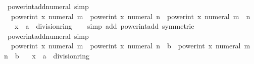 \begin{isabellebody}
\isanewline
\isanewline
\isanewline
{}\isamarkupfalse%
\ power{\isacharunderscore}{\kern0pt}int{\isacharunderscore}{\kern0pt}add{\isacharunderscore}{\kern0pt}numeral\ {\isacharbrackleft}{\kern0pt}simp{\isacharbrackright}{\kern0pt}{\isacharcolon}{\kern0pt}\isanewline
\ \ {\isachardoublequoteopen}power{\isacharunderscore}{\kern0pt}int\ x\ {\isacharparenleft}{\kern0pt}numeral\ m{\isacharparenright}{\kern0pt}\ {\isacharasterisk}{\kern0pt}\ power{\isacharunderscore}{\kern0pt}int\ x\ {\isacharparenleft}{\kern0pt}numeral\ n{\isacharparenright}{\kern0pt}\ {\isacharequal}{\kern0pt}\ power{\isacharunderscore}{\kern0pt}int\ x\ {\isacharparenleft}{\kern0pt}numeral\ {\isacharparenleft}{\kern0pt}m\ {\isacharplus}{\kern0pt}\ n{\isacharparenright}{\kern0pt}{\isacharparenright}{\kern0pt}{\isachardoublequoteclose}\isanewline
\ \ \ x\ {\isacharcolon}{\kern0pt}{\isacharcolon}{\kern0pt}\ {\isachardoublequoteopen}{\isacharprime}{\kern0pt}a\ {\isacharcolon}{\kern0pt}{\isacharcolon}{\kern0pt}\ division{\isacharunderscore}{\kern0pt}ring{\isachardoublequoteclose}\isanewline
%
\isadelimproof
\ \ %
\endisadelimproof
%
\isatagproof
{}\isamarkupfalse%
\ {\isacharparenleft}{\kern0pt}simp\ add{\isacharcolon}{\kern0pt}\ power{\isacharunderscore}{\kern0pt}int{\isacharunderscore}{\kern0pt}add\ {\isacharbrackleft}{\kern0pt}symmetric{\isacharbrackright}{\kern0pt}{\isacharparenright}{\kern0pt}%
\endisatagproof
{\isafoldproof}%
%
\isadelimproof
\isanewline
%
\endisadelimproof
\isanewline
{}\isamarkupfalse%
\ power{\isacharunderscore}{\kern0pt}int{\isacharunderscore}{\kern0pt}add{\isacharunderscore}{\kern0pt}numeral{}\ {\isacharbrackleft}{\kern0pt}simp{\isacharbrackright}{\kern0pt}{\isacharcolon}{\kern0pt}\isanewline
\ \ {\isachardoublequoteopen}power{\isacharunderscore}{\kern0pt}int\ x\ {\isacharparenleft}{\kern0pt}numeral\ m{\isacharparenright}{\kern0pt}\ {\isacharasterisk}{\kern0pt}\ {\isacharparenleft}{\kern0pt}power{\isacharunderscore}{\kern0pt}int\ x\ {\isacharparenleft}{\kern0pt}numeral\ n{\isacharparenright}{\kern0pt}\ {\isacharasterisk}{\kern0pt}\ b{\isacharparenright}{\kern0pt}\ {\isacharequal}{\kern0pt}\ power{\isacharunderscore}{\kern0pt}int\ x\ {\isacharparenleft}{\kern0pt}numeral\ {\isacharparenleft}{\kern0pt}m\ {\isacharplus}{\kern0pt}\ n{\isacharparenright}{\kern0pt}{\isacharparenright}{\kern0pt}\ {\isacharasterisk}{\kern0pt}\ b{\isachardoublequoteclose}\isanewline
\ \ \ x\ {\isacharcolon}{\kern0pt}{\isacharcolon}{\kern0pt}\ {\isachardoublequoteopen}{\isacharprime}{\kern0pt}a\ {\isacharcolon}{\kern0pt}{\isacharcolon}{\kern0pt}\ division{\isacharunderscore}{\kern0pt}ring{\isachardoublequoteclose}\isanewline

\end{isabellebody}
